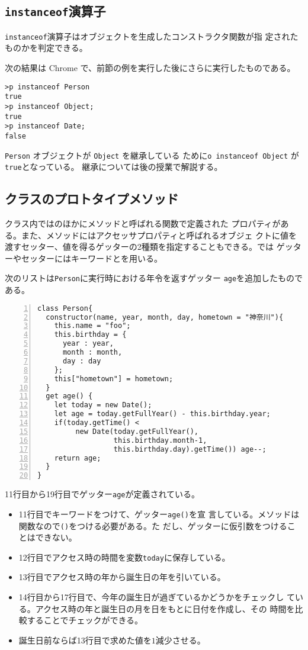 \subsection{\protect\texttt{instanceof}演算子}
\texttt{instanceof}演算子はオブジェクトを生成したコンストラクタ関数が指
定されたものかを判定できる。
\begin{Exec}\upshape
次の結果は Chrome で、前節の例を実行した後にさらに実行したものである。
\begin{Verbatim}
>p instanceof Person
true
>p instanceof Object;
true
>p instanceof Date;
false
\end{Verbatim}
\verb+Person+ オブジェクトが \verb+Object+ を継承している
 ために\texttt{o instanceof Object} が\texttt{true}となっている。
 継承については後の授業で解説する。
 \end{Exec}
\subsection{クラスのプロトタイプメソッド}
クラス内ではのほかにメソッドと呼ばれる関数で定義された
プロパティがある。また、メソッドにはアクセッサプロパティと呼ばれるオブジェ
クトに値を渡すセッター、値を得るゲッターの2種類を指定することもできる。\ES では
ゲッターやセッターにはキーワードとを用いる。
\begin{Exec}\upshape\label{PersonWidthGetter}
次のリストは\texttt{Person}に実行時における年令を返すゲッター
\texttt{age}を追加したものである。
\begin{Verbatim}[numbers=left]
class Person{
  constructor(name, year, month, day, hometown = "神奈川"){
    this.name = "foo";
    this.birthday = {
      year : year,
      month : month,
      day : day
    };
    this["hometown"] = hometown;
  }
  get age() {
    let today = new Date();
    let age = today.getFullYear() - this.birthday.year;
    if(today.getTime() <
         new Date(today.getFullYear(),
                  this.birthday.month-1,
                  this.birthday.day).getTime()) age--;
    return age;
  }
}
\end{Verbatim}
11行目から19行目でゲッター\texttt{age}が定義されている。
 \begin{itemize}
 \item 11行目でキーワードをつけて、ゲッター\texttt{age()}を宣
       言している。メソッドは関数なので\texttt{()}をつける必要がある。た
       だし、ゲッターに仮引数をつけることはできない。
 \item 12行目でアクセス時の時間を変数\texttt{today}に保存している。
 \item 13行目でアクセス時の年から誕生日の年を引いている。
 \item 14行目から17行目で、今年の誕生日が過ぎているかどうかをチェックし
       ている。アクセス時の年と誕生日の月を日をもとに日付を作成し、その
       時間を比較することでチェックができる。
 \item 誕生日前ならば13行目で求めた値を$1$減少させる。
 \end{itemize}
\end{Exec}

